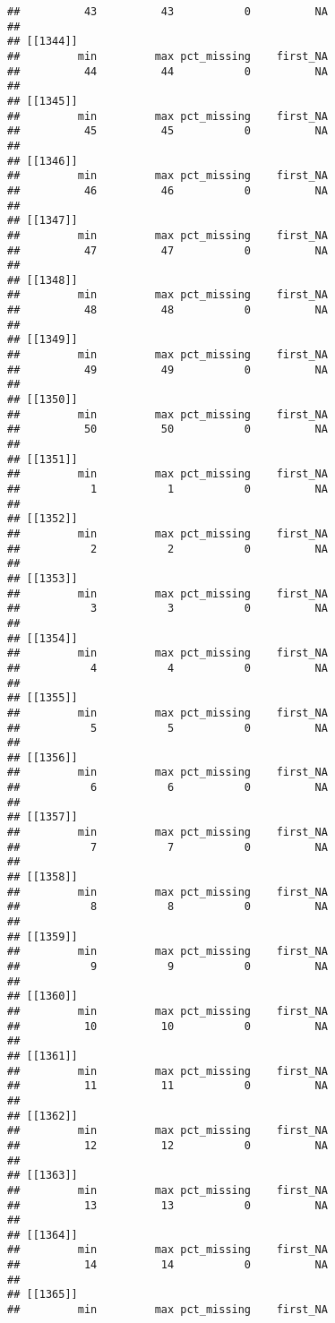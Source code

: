 \documentclass[
]{article}
\begin{document}
\begin{verbatim}
##          43          43           0          NA 
## 
## [[1344]]
##         min         max pct_missing    first_NA 
##          44          44           0          NA 
## 
## [[1345]]
##         min         max pct_missing    first_NA 
##          45          45           0          NA 
## 
## [[1346]]
##         min         max pct_missing    first_NA 
##          46          46           0          NA 
## 
## [[1347]]
##         min         max pct_missing    first_NA 
##          47          47           0          NA 
## 
## [[1348]]
##         min         max pct_missing    first_NA 
##          48          48           0          NA 
## 
## [[1349]]
##         min         max pct_missing    first_NA 
##          49          49           0          NA 
## 
## [[1350]]
##         min         max pct_missing    first_NA 
##          50          50           0          NA 
## 
## [[1351]]
##         min         max pct_missing    first_NA 
##           1           1           0          NA 
## 
## [[1352]]
##         min         max pct_missing    first_NA 
##           2           2           0          NA 
## 
## [[1353]]
##         min         max pct_missing    first_NA 
##           3           3           0          NA 
## 
## [[1354]]
##         min         max pct_missing    first_NA 
##           4           4           0          NA 
## 
## [[1355]]
##         min         max pct_missing    first_NA 
##           5           5           0          NA 
## 
## [[1356]]
##         min         max pct_missing    first_NA 
##           6           6           0          NA 
## 
## [[1357]]
##         min         max pct_missing    first_NA 
##           7           7           0          NA 
## 
## [[1358]]
##         min         max pct_missing    first_NA 
##           8           8           0          NA 
## 
## [[1359]]
##         min         max pct_missing    first_NA 
##           9           9           0          NA 
## 
## [[1360]]
##         min         max pct_missing    first_NA 
##          10          10           0          NA 
## 
## [[1361]]
##         min         max pct_missing    first_NA 
##          11          11           0          NA 
## 
## [[1362]]
##         min         max pct_missing    first_NA 
##          12          12           0          NA 
## 
## [[1363]]
##         min         max pct_missing    first_NA 
##          13          13           0          NA 
## 
## [[1364]]
##         min         max pct_missing    first_NA 
##          14          14           0          NA 
## 
## [[1365]]
##         min         max pct_missing    first_NA 

\end{verbatim}
\end{document}
